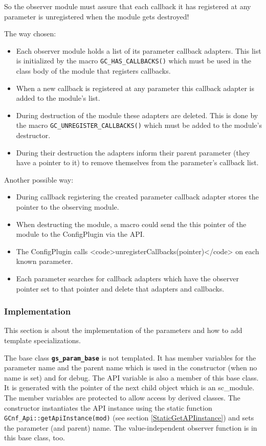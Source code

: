 So the observer module must assure that each callback it has registered at any parameter is unregistered when the module gets destroyed!

The way chosen:
\begin{itemize}
  \item Each observer module holds a list of its parameter callback adapters. This list is initialized by the macro \lstinline|GC_HAS_CALLBACKS()| which must be used in the class body of the module that registers callbacks.
  \item When a new callback is registered at any parameter this callback adapter is added to the module's list.
  \item During destruction of the module these adapters are deleted. This is done by the macro \lstinline|GC_UNREGISTER_CALLBACKS()| which must be added to the module's destructor.
  \item During their destruction the adapters inform their parent parameter (they have a pointer to it) to remove themselves from the parameter's callback list.
\end{itemize}

Another possible way:
\begin{itemize}
  \item During callback registering the created parameter callback adapter stores the pointer to the observing module.
  \item When destructing the module, a macro could send the this pointer of the module to the ConfigPlugin via the API.
  \item The ConfigPlugin calls <code>unregisterCallbacks(pointer)</code> on each known parameter.
  \item Each parameter searches for callback adapters which have the observer pointer set to that pointer and delete that adapters and callbacks.
\end{itemize}

\subsubsection{Implementation}\label{sec:ParamImplementation}
This section is about the implementation of the \GreenConfig parameters and how to add template specializations.

The base class {\bf \lstinline|gs_param_base|} is not templated. It has member variables for the
parameter name and the parent name which is used in the constructor (when no name is set) and for debug. The \GreenConfig API variable is also a member of this base class. It is generated with the pointer of the next child object which is an sc\_module. The member variables are protected to allow access by derived classes. The constructor instantiates the API instance using the static function \lstinline|GCnf_Api::getApiInstance(mod)| (see section \ref{StaticGetAPIinstance}) and sets the parameter (and parent) name. The value-independent observer function is in this base class, too.

